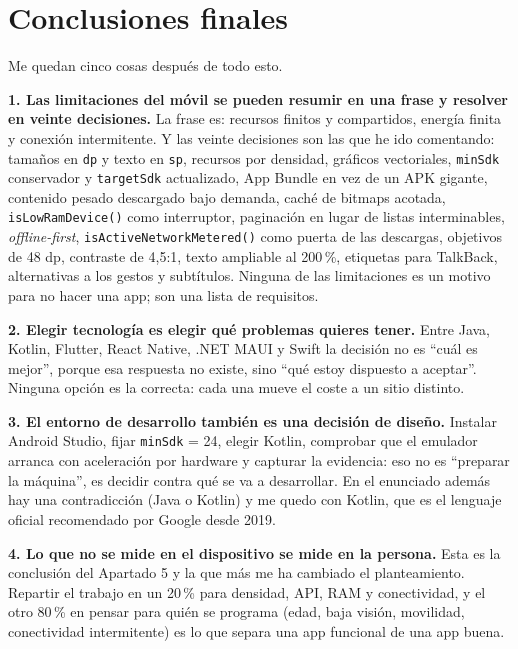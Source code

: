 \documentclass[11pt,a4paper]{article}
\newcommand{\code}[1]{\texttt{\color{navylight}#1}}
\begin{document}
	\newpage
	\section*{Conclusiones finales}
	
	Me quedan cinco cosas después de todo esto.
	
	\textbf{1. Las limitaciones del móvil se pueden resumir en una frase y resolver en veinte decisiones.} La frase es: recursos finitos y compartidos, energía finita y conexión intermitente. Y las veinte decisiones son las que he ido comentando: tamaños en \code{dp} y texto en \code{sp}, recursos por densidad, gráficos vectoriales, \code{minSdk} conservador y \code{targetSdk} actualizado, App Bundle en vez de un APK gigante, contenido pesado descargado bajo demanda, caché de bitmaps acotada, \code{isLowRamDevice()} como interruptor, paginación en lugar de listas interminables, \emph{offline-first}, \code{isActiveNetworkMetered()} como puerta de las descargas, objetivos de 48 dp, contraste de 4,5:1, texto ampliable al 200\,\%, etiquetas para TalkBack, alternativas a los gestos y subtítulos. Ninguna de las limitaciones es un motivo para no hacer una app; son una lista de requisitos.
	
	\textbf{2. Elegir tecnología es elegir qué problemas quieres tener.} Entre Java, Kotlin, Flutter, React Native, .NET MAUI y Swift la decisión no es \enquote{cuál es mejor}, porque esa respuesta no existe, sino \enquote{qué estoy dispuesto a aceptar}. Ninguna opción es la correcta: cada una mueve el coste a un sitio distinto.
	
	\textbf{3. El entorno de desarrollo también es una decisión de diseño.} Instalar Android Studio, fijar \code{minSdk} = 24, elegir Kotlin, comprobar que el emulador arranca con aceleración por hardware y capturar la evidencia: eso no es \enquote{preparar la máquina}, es decidir contra qué se va a desarrollar. En el enunciado además hay una contradicción (Java o Kotlin) y me quedo con Kotlin, que es el lenguaje oficial recomendado por Google desde 2019.
	
	\textbf{4. Lo que no se mide en el dispositivo se mide en la persona.} Esta es la conclusión del Apartado 5 y la que más me ha cambiado el planteamiento. Repartir el trabajo en un 20\,\% para densidad, API, RAM y conectividad, y el otro 80\,\% en pensar para quién se programa (edad, baja visión, movilidad, conectividad intermitente) es lo que separa una app funcional de una app buena.
	
\end{document}
